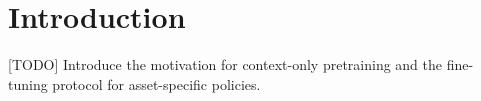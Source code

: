 \section{Introduction}
\label{sec:introduction}

[TODO] Introduce the motivation for context-only pretraining and the fine-tuning protocol for asset-specific policies.
